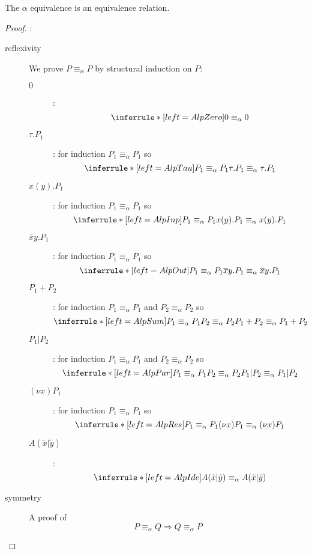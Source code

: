 \begin{lemma}
  The $\alpha$ equivalence is an equivalence relation.
  \begin{proof}:
    \begin{description}
      \item[reflexivity]
	We prove $P\equiv_{\alpha}P$ by structural induction on $P$:
	\begin{description}
	  \item[$0$]:
	    \[\inferrule* [left=AlpZero]{
	    }{
	      0\equiv_{\alpha}0
	    }\]
	  \item[$\tau.P_{1}$]:
	    for induction $P_{1}\equiv_{\alpha}P_{1}$ so
	    \[\inferrule* [left=AlpTau]{
	      P_{1}\equiv_{\alpha}P_{1}
	    }{
	      \tau.P_{1}\equiv_{\alpha}\tau.P_{1}
	    }\]
	  \item[$x(y).P_{1}$]:
	    for induction $P_{1}\equiv_{\alpha}P_{1}$ so
	    \[\inferrule* [left=AlpInp]{
	      P_{1}\equiv_{\alpha}P_{1}
	    }{
	      x(y).P_{1}\equiv_{\alpha}x(y).P_{1}
	    }\]
	  \item[$\overline{x}y.P_{1}$]:
	    for induction $P_{1}\equiv_{\alpha}P_{1}$ so
	    \[\inferrule* [left=AlpOut]{
	      P_{1}\equiv_{\alpha}P_{1}
	    }{
	      \overline{x}y.P_{1}\equiv_{\alpha}\overline{x}y.P_{1}
	    }\]
	  \item[$P_{1}+P_{2}$]:
	    for induction $P_{1}\equiv_{\alpha}P_{1}$ and $P_{2}\equiv_{\alpha}P_{2}$ so
	    \[\inferrule* [left=AlpSum]{
		  P_{1}\equiv_{\alpha}P_{1}
		\\
		  P_{2}\equiv_{\alpha}P_{2}
	    }{
	      P_{1}+P_{2}\equiv_{\alpha}P_{1}+P_{2}
	    }\]
	  \item[$P_{1}|P_{2}$]:
	    for induction $P_{1}\equiv_{\alpha}P_{1}$ and $P_{2}\equiv_{\alpha}P_{2}$ so
	    \[\inferrule* [left=AlpPar]{
		  P_{1}\equiv_{\alpha}P_{1}
		\\
		  P_{2}\equiv_{\alpha}P_{2}
	    }{
	      P_{1}|P_{2}\equiv_{\alpha}P_{1}|P_{2}
	    }\]
	  \item[$(\nu x)P_{1}$]:
	    for induction $P_{1}\equiv_{\alpha}P_{1}$ so
	    \[\inferrule* [left=AlpRes]{
	      P_{1}\equiv_{\alpha}P_{1}
	    }{
	      (\nu x)P_{1}\equiv_{\alpha}(\nu x)P_{1}
	    }\]
	  \item[$A(\tilde{x}|\tilde{y})$]:
	    \[\inferrule* [left=AlpIde]{
	    }{
	      A(\tilde{x}|\tilde{y})\equiv_{\alpha}A(\tilde{x}|\tilde{y})
	    }\]
	\end{description}
      \item[symmetry]
	A proof of 
	\[
	  P\equiv_{\alpha}Q\Rightarrow Q\equiv_{\alpha}P
\]
\end{description}
\end{proof}
\end{lemma}

